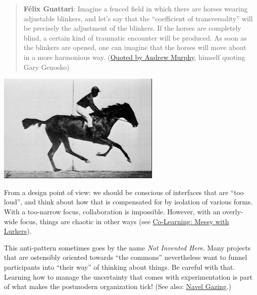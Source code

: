 \begin{quote}
\textbf{Félix Guattari}: Imagine a fenced field in which there are
horses wearing adjustable blinkers, and let's say that the ``coefficient
of transversality'' will be precisely the adjustment of the blinkers. If
the horses are completely blind, a certain kind of traumatic encounter
will be produced. As soon as the blinkers are opened, one can imagine
that the horses will move about in a more harmonious way.
(\href{http://nine.fibreculturejournal.org/}{Quoted by Andrew Murphy},
himself quoting Gary Genosko)
\end{quote}

\begin{center}
\includegraphics[width=.85\textwidth]{../pictures/horse.jpg}
\end{center}

From a design point of view: we should be conscious of interfaces that
are ``too loud'', and think about how that is compensated for by
isolation of various forms. With a too-narrow focus, collaboration is
impossible. However, with an overly-wide focus, things are chaotic in
other ways (see
\href{http://peeragogy.org/practice/antipatterns/co-learning-messy-with-lurkers/}{Co-Learning:
Messy with Lurkers}).

This anti-pattern sometimes goes by the name \emph{Not Invented Here}.
Many projects that are ostensibly oriented towards ``the commons''
nevertheless want to funnel participants into ``their way'' of thinking
about things. Be careful with that. Learning how to manage the
uncertainty that comes with experimentation is part of what makes the
postmodern organization tick! (See also:
\href{http://peeragogy.org/antipatterns/navel-gazing/}{Navel Gazing}.)
